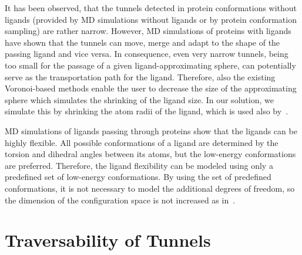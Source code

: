 \documentclass[usletter, 10pt, conference]{ieeeconf} %
\begin{document}
It has been observed, that the tunnels detected in protein conformations without ligands (provided by MD simulations without ligands or by
protein conformation sampling) are rather narrow. 
However, MD simulations of proteins with ligands have shown that the tunnels can move, merge and adapt to the shape of the passing ligand and vice versa.
In consequence, even very narrow tunnels, being too small for the passage of a given ligand-approximating sphere, can potentially serve as the transportation path for the ligand.
Therefore, also the existing Voronoi-based methods enable the user to decrease the size of the approximating sphere which simulates the shrinking of the ligand size.
In our solution, we simulate this by shrinking the atom radii of the ligand, which is used also by~\cite{cortes2010simulating,guieysse2008structure}.

MD simulations of ligands passing through proteins show that the ligands can be highly flexible.
All possible conformations of a ligand are determined by the torsion and dihedral angles between its atoms, but the low-energy conformations are preferred.
Therefore, the ligand flexibility can be modeled using only a predefined set of low-energy conformations.
By using the set of predefined conformations, it is not necessary to model the additional degrees of freedom, so 
the dimension of the configuration space is not increased as in~\cite{cortes2010simulating}.





\section{Traversability of Tunnels}
\end{document}
